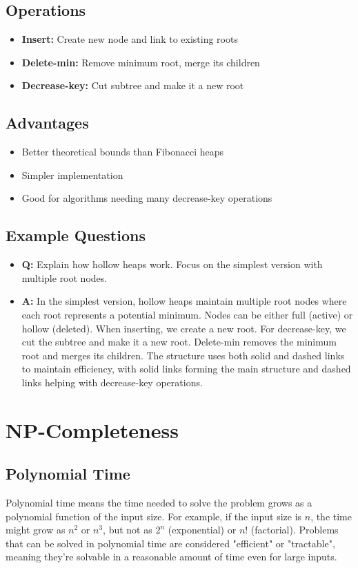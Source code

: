 \documentclass[11pt,a4paper]{article}
\begin{document}
\begin{multicols}{2}
\subsection{Operations}
\begin{itemize}
    \item \textbf{Insert:} Create new node and link to existing roots
    \item \textbf{Delete-min:} Remove minimum root, merge its children
    \item \textbf{Decrease-key:} Cut subtree and make it a new root
\end{itemize}

\subsection{Advantages}
\begin{itemize}
    \item Better theoretical bounds than Fibonacci heaps
    \item Simpler implementation
    \item Good for algorithms needing many decrease-key operations
\end{itemize}

\subsection{Example Questions}
\begin{itemize}
    \item \textbf{Q:} Explain how hollow heaps work. Focus on the simplest version with multiple root nodes.
    \item \textbf{A:} In the simplest version, hollow heaps maintain multiple root nodes where each root represents a potential minimum. Nodes can be either full (active) or hollow (deleted). When inserting, we create a new root. For decrease-key, we cut the subtree and make it a new root. Delete-min removes the minimum root and merges its children. The structure uses both solid and dashed links to maintain efficiency, with solid links forming the main structure and dashed links helping with decrease-key operations.
\end{itemize}

\section{NP-Completeness}
\subsection{Polynomial Time}
Polynomial time means the time needed to solve the problem grows as a polynomial function of the input size.
For example, if the input size is $n$, the time might grow as $n^2$ or $n^3$, but not as $2^n$ (exponential) or $n!$ (factorial).
Problems that can be solved in polynomial time are considered "efficient" or "tractable", meaning they're solvable in a reasonable amount of time even for large inputs.


\end{multicols}
\end{document}
